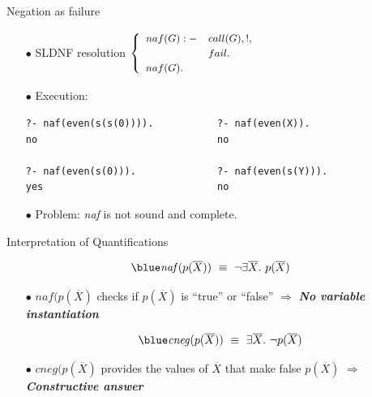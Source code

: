 \documentclass[pdf,slideColor,contemporain]{prosper}
\begin{document}
\begin{slide}{Negation as failure}
\begin{itemize}

\vspace{-0.2cm}
\item[{\blue $\bullet$}] SLDNF resolution  $
         {\small
         \begin{cases}
         \begin{array}{ll}
              naf(G) :- & call(G),!, \\
                        & fail. \\
              naf(G). &
          \end{array}
          \end{cases}} $\\

\vspace{0.2cm}

\item[{\blue $\bullet$}] Execution:
\begin{tiny}
\begin{verbatim}
?- naf(even(s(s(0)))).           ?- naf(even(X)).
no                               no

?- naf(even(s(0))).              ?- naf(even(s(Y))).
yes                              no
\end{verbatim}
\end{tiny}
\vspace{0.2cm}
\item[{\blue $\bullet$}] Problem: \emph{naf} is not sound and complete.
\end{itemize}
\end{slide}

\begin{slide}{Interpretation of Quantif{ic}ations}

\vspace{0.5cm}
\[\mathit{\blue naf}(p(\overline{X}))~ \equiv ~ \neg \exists \overline{X}. ~ p(\overline{X})\]
\begin{itemize}

     \item[{\blue $\bullet$}] $naf(p(\overline{X})$ checks if
     $p(\overline{X})$ is ``true'' or ``false'' $\Rightarrow$
     \emph{\bf No variable instantiation}
\vspace{0.5cm}

\[\mathit{\blue cneg}(p(\overline{X}))~ \equiv ~ \exists \overline{X}. ~  \neg p(\overline{X})\]
\vspace{-0.4cm}
 
     \item[{\blue $\bullet$}]  $cneg(p(\overline{X})$ provides the values of
     $\overline{X}$ that make false $p(\overline{X})$ $\Rightarrow$
     \emph{\bf Constructive answer}
\end{itemize}
\end{slide}
\end{document}
